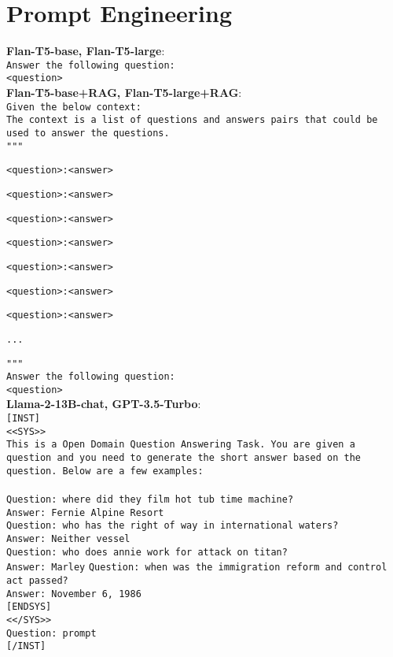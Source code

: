 \section{Prompt Engineering}\label{sec:prompt_engineering}

\textbf{Flan-T5-base, Flan-T5-large}: \\
\texttt{Answer the following question:} \\
\texttt{<question>} \\

\noindent \textbf{Flan-T5-base+RAG, Flan-T5-large+RAG}: \\
\noindent \texttt{Given the below context:} \\

\noindent \texttt{The context is a list of questions and answers pairs that could be used to answer the questions.} \\

\noindent \texttt{"""}

\texttt{<question>:<answer>}

\texttt{<question>:<answer>}

\texttt{<question>:<answer>}

\texttt{<question>:<answer>}

\texttt{<question>:<answer>}

\texttt{<question>:<answer>}

\texttt{<question>:<answer>}

\texttt{...}

\noindent \texttt{"""} \\

\noindent \texttt{Answer the following question:} \\
\noindent \texttt{<question>} \\

\noindent \textbf{Llama-2-13B-chat, GPT-3.5-Turbo}: \\
\texttt{[INST]} \\
\texttt{<<SYS>>} \\
\texttt{This is a Open Domain Question Answering Task. You are given a question and you need to generate the short answer based on the question. Below are a few examples:} \\ \\
\texttt{Question: where did they film hot tub time machine?} \\
\texttt{Answer: Fernie Alpine Resort} \\
\texttt{Question: who has the right of way in international waters?} \\
\texttt{Answer: Neither vessel} \\
\texttt{Question: who does annie work for attack on titan?} \\
\texttt{Answer: Marley}
\texttt{Question: when was the immigration reform and control act passed?} \\
\texttt{Answer: November 6, 1986} \\
\texttt{[ENDSYS]} \\
\texttt{<</SYS>>} \\
\texttt{Question: {prompt}} \\
\texttt{[/INST]} \\

